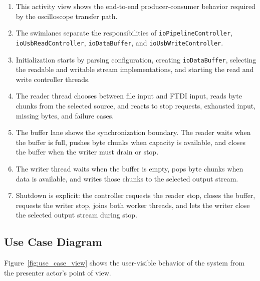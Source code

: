 \begin{enumerate}
    \item This activity view shows the end-to-end producer-consumer behavior required by the oscilloscope transfer path.
    \item The swimlanes separate the responsibilities of \texttt{ioPipelineController}, \texttt{ioUsbReadController}, \texttt{ioDataBuffer}, and \texttt{ioUsbWriteController}.
    \item Initialization starts by parsing configuration, creating \texttt{ioDataBuffer}, selecting the readable and writable stream implementations, and starting the read and write controller threads.
    \item The reader thread chooses between file input and FTDI input, reads byte chunks from the selected source, and reacts to stop requests, exhausted input, missing bytes, and failure cases.
    \item The buffer lane shows the synchronization boundary. The reader waits when the buffer is full, pushes byte chunks when capacity is available, and closes the buffer when the writer must drain or stop.
    \item The writer thread waits when the buffer is empty, pops byte chunks when data is available, and writes those chunks to the selected output stream.
    \item Shutdown is explicit: the controller requests the reader stop, closes the buffer, requests the writer stop, joins both worker threads, and lets the writer close the selected output stream during stop.
\end{enumerate}

\subsection{Use Case Diagram}
\label{Section::Use Case Diagram}


Figure~\ref{fig:use_case_view} shows the user-visible behavior of the system from the presenter actor's point of view.

